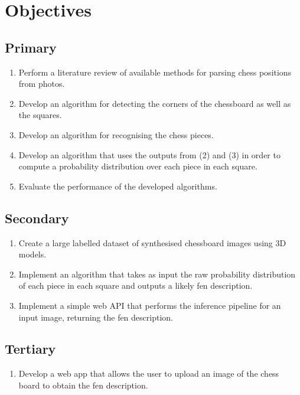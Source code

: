 \section{Objectives}
\subsection{Primary}
\begin{enumerate}
    \item Perform a literature review of available methods for parsing chess positions from photos.
    \item Develop an algorithm for detecting the corners of the chessboard as well as the squares.
    \item Develop an algorithm for recognising the chess pieces.
    \item Develop an algorithm that uses the outputs from (2) and (3) in order to compute a probability distribution over each piece in each square.
    \item Evaluate the performance of the developed algorithms.
\end{enumerate}
    

\subsection{Secondary}
\begin{enumerate}
    \item Create a large labelled dataset of synthesised chessboard images using 3D models.
    \item Implement an algorithm that takes as input the raw probability distribution of each piece in each square and outputs a likely \gls{fen} description.
    \item Implement a simple web API that performs the inference pipeline for an input image, returning the \gls{fen} description. 
\end{enumerate}
\subsection{Tertiary}
\begin{enumerate}
    \item Develop a web app that allows the user to upload an image of the chess board to obtain the \gls{fen} description.
\end{enumerate}